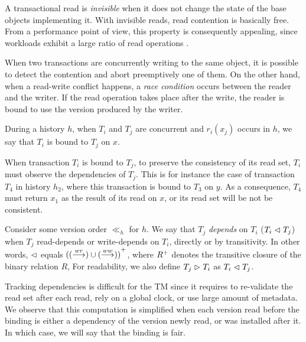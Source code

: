 A transactional read is \emph{invisible} when it does not change the state of the base objects implementing it.
With invisible reads, read contention is basically free.
From a performance point of view, this property is consequently appealing, since workloads exhibit a large ratio of read operations \cite{stampBenchmark}.

When two transactions are concurrently writing to the same object, it is possible to detect the contention and abort preemptively one of them.
On the other hand, when a read-write conflict happens, a \emph{race condition} occurs between the reader and the writer.
If the read operation takes place after the write, the reader is bound to use the version produced by the writer.

\begin{definition}[Binding]
  During a history $h$, when $T_i$ and $T_j$ are concurrent and $r_i(x_j)$ occurs in $h$, we say that $T_i$ is bound to $T_j$ on $x$.
\end{definition}

When transaction $T_i$ is bound to $T_j$, to preserve the consistency of its read set, $T_i$ must observe the dependencies of $T_j$.
This is for instance the case of transaction $T_4$ in history $h_2$, where this transaction is bound to $T_3$ on $y$.
As a consequence, $T_4$ must return $x_1$ as the result of its read on $x$, or its read set will be not be consistent.

\begin{definition}[Dependency]
  Consider some version order $\ll_h$ for $h$.
  We say that $T_j$ \emph{depends} on $T_i$ ($T_i \rdepends T_j$)  when $T_j$ read-depends or write-depends on $T_i$, directly or by transitivity.
  In other words, $\rdepends$ equals $\closureOf{((\wrdep) \union (\wwdep))}$, where $\closureOf{R}$ denotes the transitive closure of the binary relation $R$,
  For readability, we also define $T_j \depends T_i$ as $T_i \rdepends T_j$.
\end{definition}

Tracking dependencies is difficult for the TM since it requires to re-validate the read set after each read, rely on a global clock, or use large amount of metadata.
We observe that this computation is simplified when each version read before the binding is either a dependency of the version newly read, or was installed after it.
In which case, we will say that the binding is fair.

